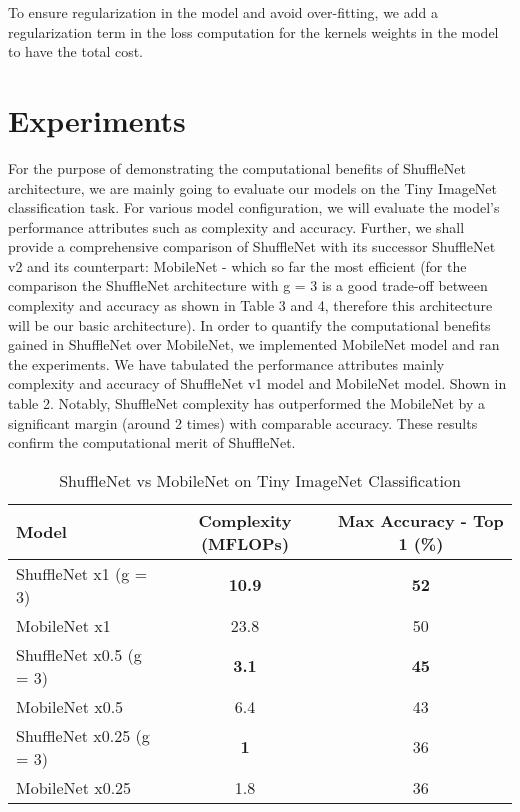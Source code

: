 \documentclass{article}
\begin{document}
To ensure regularization in the model and avoid over-fitting, we add a regularization term in the loss computation for the kernels weights in the model to have the total cost.

\section{Experiments} 

For the purpose of demonstrating the computational benefits of ShuffleNet architecture, we are mainly going to evaluate our models on the Tiny ImageNet classification task. For various model configuration, we will evaluate the model's performance attributes such as complexity and accuracy. Further, we shall provide a comprehensive comparison of ShuffleNet with its successor ShuffleNet v2 and its counterpart: MobileNet - which so far the most efficient (for the comparison the ShuffleNet architecture with g = 3 is a good trade-off between complexity and accuracy as shown in Table 3 and 4, therefore this architecture will be our basic architecture).
\newpage 
In order to quantify the computational benefits gained in ShuffleNet over MobileNet, we implemented MobileNet model and ran the experiments. We have tabulated the performance attributes mainly complexity and accuracy of ShuffleNet v1 model and MobileNet model. Shown in table 2. Notably, ShuffleNet complexity has outperformed the MobileNet by a significant margin (around 2 times) with comparable accuracy. These results confirm the computational merit of ShuffleNet.

\begin{table}[H]
  \caption{ShuffleNet vs MobileNet on Tiny ImageNet Classification}
  \label{sample-table}
  \centering
  \begin{tabular}{lcc}
    \toprule
    Model     & Complexity (MFLOPs) & Max Accuracy - Top 1 (\%)    \\
    \midrule
    ShuffleNet x1 (g = 3) & \textbf{10.9} & \textbf{52}   \\
    MobileNet x1 & 23.8 & 50 \\
    \midrule
    ShuffleNet x0.5 (g = 3) & \textbf{3.1} & \textbf{45}    \\
    MobileNet x0.5 & 6.4 & 43\\
    \midrule
    ShuffleNet x0.25 (g = 3) & \textbf{1} & 36 \\
    MobileNet x0.25 & 1.8 & 36 \\
    \bottomrule
  \end{tabular}
\end{table}
\end{document}
